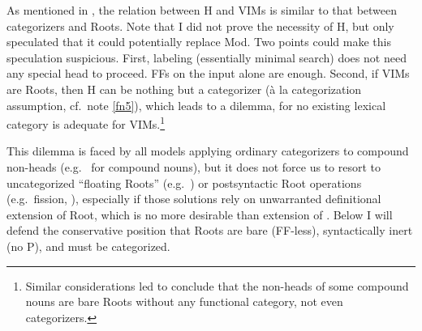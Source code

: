 \documentclass[output=paper]{langsci/langscibook}
\begin{document}
As mentioned in , the relation between H and \glspl{VIM} is similar to
that between categorizers and Roots. Note that I did not prove the necessity of
H, but only speculated that it could potentially replace  Mod.
Two points could make this speculation suspicious. First, labeling (essentially
minimal search) does not need any special head to proceed. FFs on the 
input alone are enough. Second, if \glspl{VIM} are Roots, then H can be nothing but a
categorizer (\`{a} la categorization assumption, cf.\ note \ref{fn5}), which
leads to a dilemma, for no existing lexical category is adequate for
\glspl{VIM}.\footnote{Similar considerations led \citet{deBeldervanKoppen2016} to
conclude that the non-heads of some  compound nouns are bare Roots without any
functional category, not even categorizers.}%

This dilemma is faced by all models applying ordinary categorizers to compound
non-heads (e.g.\ \citealt{Harley2009} for compound nouns), but it does not
force us to resort to uncategorized ``floating Roots'' (e.g.\
\citealt{deBeldervanKoppen2016}) or postsyntactic Root operations (e.g.\
fission, \citealt{deBelder2017}), especially if those solutions rely on
unwarranted definitional extension of Root, which is no more desirable than
extension of \isi{Merge}. Below I will defend the conservative position that Roots
are bare (FF-less), syntactically inert (no {\textsurd}P), and must be
categorized.
\end{document}
